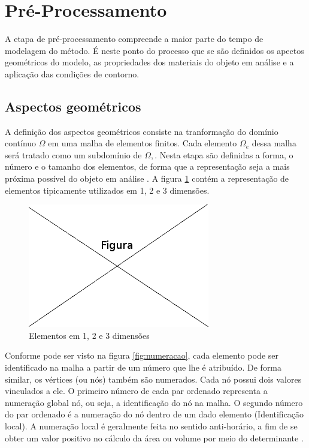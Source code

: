 \section{Pré-Processamento}

A etapa de pré-processamento compreende a maior parte do tempo de modelagem do método. É neste ponto do processo que se são definidos os apectos geométricos do modelo, as propriedades dos materiais do objeto em análise e a aplicação das condições de contorno. \citep[p. 9, 665]{zien}

\subsection{Aspectos geométricos} 
A definição dos aspectos geométricos consiste na tranformação do domínio contínuo $\Omega$ em uma malha de elementos finitos. Cada elemento $\Omega_e$ dessa malha será tratado como um subdomínio de $\Omega,$.  
Nesta etapa são definidas a forma, o número e o tamanho dos elementos, de forma que a representação seja a mais próxima possível do objeto em análise \citep[p. 154]{desai}.
A figura \ref{fig:elementos} contém a representação de elementos tipicamente utilizados em 1, 2 e 3 dimensões. 

\begin{figure}[!htb]
\centering
\includegraphics[scale=0.5]{figuras/temp.png}
\caption{Elementos em 1, 2 e 3 dimensões}
\label{fig:elementos}
\end{figure}

Conforme pode ser visto na figura \ref{fig:numeracao}, cada elemento pode ser identificado na malha a partir de um número que lhe é atribuído. De forma similar, os vértices (ou nós) também são numerados. Cada nó possui dois valores vinculados a ele. 
O primeiro número de cada par ordenado representa a numeração global nó, ou seja, a identificação do nó na malha. O segundo número do par ordenado é a numeração do nó dentro de um dado elemento (Identificação local). A numeração local é geralmente feita no sentido anti-horário, a fim de se obter um valor positivo no cálculo da área ou volume por meio do  determinante \citep[p. 394]{sadiku}. 


